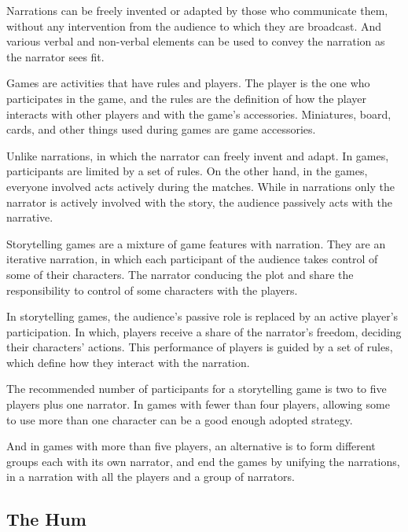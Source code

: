 \documentclass[11pt]{article}
\begin{document}
\begin{multicols}{2}
Narrations can be freely invented or adapted by those who communicate them, without any intervention from the audience to which they are broadcast. And various verbal and non-verbal elements can be used to convey the narration as the narrator sees fit.

Games are activities that have rules and players. The player is the one who participates in the game, and the rules are the definition of how the player interacts with other players and with the game's accessories. Miniatures, board, cards, and other things used during games are game accessories.

Unlike narrations, in which the narrator can freely invent and adapt. In games, participants are limited by a set of rules. On the other hand, in the games, everyone involved acts actively during the matches. While in narrations only the narrator is actively involved with the story, the audience passively acts with the narrative.

Storytelling games are a mixture of game features with narration. They are an iterative narration, in which each participant of the audience takes control of some of their characters. The narrator conducing the plot and share the responsibility to control of some characters with the players.

In storytelling games, the audience's passive role is replaced by an active player's participation. In which, players receive a share of the narrator's freedom, deciding their characters' actions. This performance of players is guided by a set of rules, which define how they interact with the narration.

The recommended number of participants for a storytelling game is two to five players plus one narrator. In games with fewer than four players, allowing some to use more than one character can be a good enough adopted strategy.

And in games with more than five players, an alternative is to form different groups each with its own narrator, and end the games by unifying the narrations, in a narration with all the players and a group of narrators.

\subsection{The Hum}


\lipsum[1]



\end{multicols}
\end{document}

